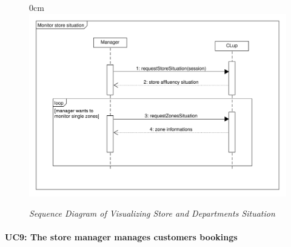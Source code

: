\documentclass{article}
\begin{document}
\begin{center}
\begin{itemize}
				\end{itemize}
			
					\begin{figure}[!h]
						\begin{adjustwidth} {0cm}{}
							\centering
							\includegraphics[scale=0.25]{SD/8_monitorStoreSituation.pdf}\\
							\caption{\emph{Sequence Diagram of Visualizing Store and Departments Situation}}
						\end{adjustwidth}
					\end{figure}
					
				\end{center}
			
			\newpage
			\paragraph{UC9: The store manager manages customers bookings}
			
\end{document}
